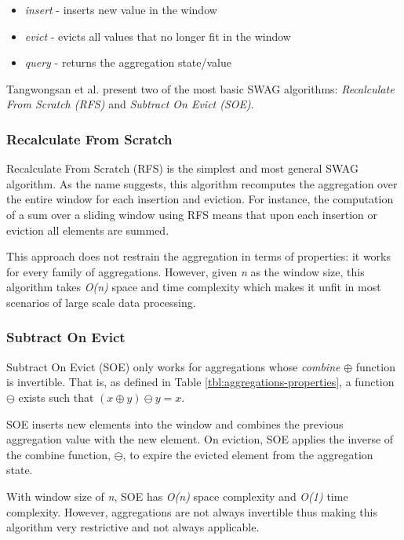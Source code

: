 \begin{itemize}
    \item \textit{insert} - inserts new value in the window
    \item \textit{evict} - evicts all values that no longer fit in the window
    \item \textit{query} - returns the aggregation state/value
\end{itemize}

Tangwongsan et al. present two of the most basic SWAG algorithms: \textit{Recalculate From Scratch (RFS)} and \textit{Subtract On Evict (SOE)}.

\subsubsection{Recalculate From Scratch}
Recalculate From Scratch (RFS) is the simplest and most general SWAG algorithm. As the name suggests, this algorithm recomputes the aggregation over the entire window for each insertion and eviction. For instance, the computation of a sum over a sliding window using RFS means that upon each insertion or eviction all elements are summed.

This approach does not restrain the aggregation in terms of properties: it works for every family of aggregations. However, given \textit{n} as the window size, this algorithm takes \textit{O(n)} space and time complexity which makes it unfit in most scenarios of large scale data processing. 

\subsubsection{Subtract On Evict}
Subtract On Evict (SOE) only works for aggregations whose  \textit{combine} $\oplus$ function is invertible. That is, as defined in Table \ref{tbl:aggregations-properties}, a function $\ominus$ exists such that $(x \oplus y) \ominus y = x$.

SOE inserts new elements into the window and combines the previous aggregation value with the new element. On eviction, SOE applies the inverse of the combine function, $\ominus$, to expire the evicted element from the aggregation state.

With window size of \textit{n}, SOE has \textit{O(n)} space complexity and \textit{O(1)} time complexity. However, aggregations are not always invertible thus making this algorithm very restrictive and not always applicable.



